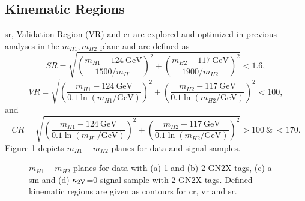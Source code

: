 \subsection{Kinematic Regions}\label{sec:kinematic_regions}
\ac{sr}, Validation Region (VR) and \ac{cr} are explored and optimized in previous analyses \citep{aad2023search,ATL-COM-PHYS-2023-033} in the $m_{H1},m_{H2}$ plane and are defined as
\begin{equation}
    SR =  \sqrt{\left(\frac{m_{H1} - \SI{124}{\GeV}}{1500 / m_{H1}}\right)^{2} + \left(\frac{m_{H2} - \SI{117}{\GeV}}{1900 / m_{H2}}\right)^{2}} < 1.6,
\end{equation}
\begin{equation}
    \label{VR_Xhh}
    VR =  \sqrt{\left(\frac{m_{H1} - \SI{124}{\GeV}}{0.1 \ln(m_{H1}/\text{GeV})}\right)^{2} + \left(\frac{m_{H2} - \SI{117}{\GeV}}{0.1 \ln(m_{H2}/\text{GeV})}\right)^{2}} < 100,
\end{equation}
and
\begin{equation}
    \label{CR_Xhh}
    CR = \sqrt{\left(\frac{m_{H1} - \SI{124}{\GeV}}{0.1 \ln(m_{H1}/\text{GeV})}\right)^{2} + \left(\frac{m_{H2} - \SI{117}{\GeV}}{0.1 \ln(m_{H2}/\text{GeV})}\right)^{2}} > 100  \ \& \ < 170.
\end{equation}
Figure \ref{fig:m_hh_plane} depicts $m_{H1}-m_{H2}$ planes for data and signal samples.
\begin{figure}
    \centering
    \caption[]{ $m_{H1}-m_{H2}$ planes for data with (a) 1 and (b) 2 GN2X tags, (c) a \ac{sm} and (d) $\kappa_{\text{2V}}$=0 signal sample with 2 GN2X tags. Defined kinematic regions are given as contours for \ac{cr}, \ac{vr} and \ac{sr}.}
    \label{fig:m_hh_plane}
\end{figure}

